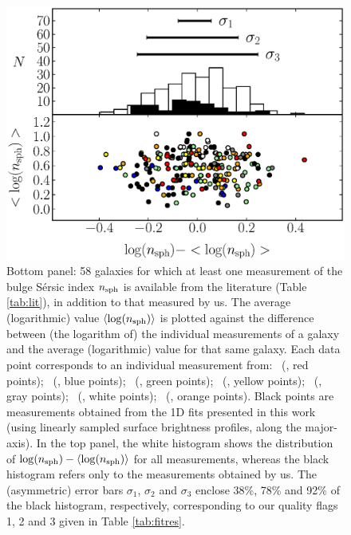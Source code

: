 \documentclass[preprint2]{emulateapj}
\begin{document}
\begin{figure}%
\begin{center}
\includegraphics[width=1.1\columnwidth]{images/comparison_all_n.eps} 
\caption{Bottom panel: 58 galaxies for which at least one measurement of the bulge S\'ersic index $n_{\rm sph}$ is available 
from the literature (Table \ref{tab:lit}), in addition to that measured by us.
The average (logarithmic) value $\langle \log(n_{\rm sph}) \rangle$ is plotted against 
the difference between (the logarithm of) the individual measurements of a galaxy 
and the average (logarithmic) value for that same galaxy.
Each data point corresponds to an individual measurement from: 
\citeauthor{grahamdriver2007}~(\citeyear{grahamdriver2007}, red points);  
\citeauthor{laurikainen2010}~(\citeyear{laurikainen2010}, blue points); 
\citeauthor{sani2011}~(\citeyear{sani2011}, green points);  
\citeauthor{vika2012}~(\citeyear{vika2012}, yellow points);
\citeauthor{beifiori2012}~(\citeyear{beifiori2012}, gray points); 
\citeauthor{rusli2013}~(\citeyear{rusli2013}, white points); 
\citeauthor{lasker2014data}~(\citeyear{lasker2014data}, orange points). 
Black points are measurements obtained from the 1D fits presented in this work 
(using linearly sampled surface brightness profiles, along the major-axis).
In the top panel, the white histogram shows the distribution of $\log(n_{\rm sph}) - \langle \log(n_{\rm sph}) \rangle$ 
for all measurements, 
whereas the black histogram refers only to the measurements obtained by us.
The (asymmetric) error bars $\sigma_1$, $\sigma_2$ and $\sigma_3$ enclose 38\%, 78\% and 92\% 
of the black histogram, respectively, 
corresponding to our quality flags 1, 2 and 3 given in Table \ref{tab:fitres}.}
\label{fig:compn}
\end{center}
\end{figure}
\end{document}
